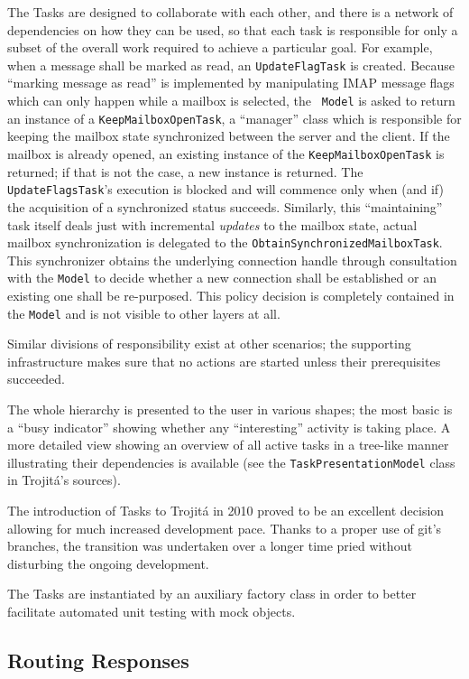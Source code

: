 \documentclass[trojita]{subfiles}
\begin{document}
The Tasks are designed to collaborate with each other, and there is a network of dependencies on how they can be used,
so that each task is responsible for only a subset of the overall work required to achieve a particular goal.  For
example, when a message shall be marked as read, an {\tt UpdateFlagTask} is created.  Because ``marking message as
read'' is implemented by manipulating IMAP message flags which can only happen while a mailbox is selected, the {\tt
Model} is asked to return an instance of a {\tt KeepMailboxOpenTask}, a ``manager'' class which is responsible for
keeping the mailbox state synchronized between the server and the client.  If the mailbox is already opened, an existing
instance of the {\tt KeepMailboxOpenTask} is returned; if that is not the case, a new instance is returned.  The {\tt
UpdateFlagsTask}'s execution is blocked and will commence only when (and if) the acquisition of a synchronized status
succeeds.  Similarly, this ``maintaining'' task itself deals just with incremental {\em updates} to the mailbox state,
actual mailbox synchronization is delegated to the {\tt ObtainSynchronizedMailboxTask}.  This synchronizer obtains the
underlying connection handle through consultation with the {\tt Model} to decide whether a new connection shall be
established or an existing one shall be re-purposed.  This policy decision is completely contained in the {\tt Model}
and is not visible to other layers at all.

Similar divisions of responsibility exist at other scenarios; the supporting infrastructure makes sure that no actions
are started unless their prerequisites succeeded.

The whole hierarchy is presented to the user in various shapes; the most basic is a ``busy indicator'' showing whether
any ``interesting'' activity is taking place.  A more detailed view showing an overview of all active tasks in a
tree-like manner illustrating their dependencies is available (see the {\tt TaskPresentationModel} class in Trojitá's
sources).

The introduction of Tasks to Trojitá in 2010 proved to be an excellent decision allowing for much increased development
pace.  Thanks to a proper use of git's branches, the transition was undertaken over a longer time pried without
disturbing the ongoing development.

The Tasks are instantiated by an auxiliary factory class in order to better facilitate automated unit testing with
mock objects.

\subsection{Routing Responses}
\end{document}
